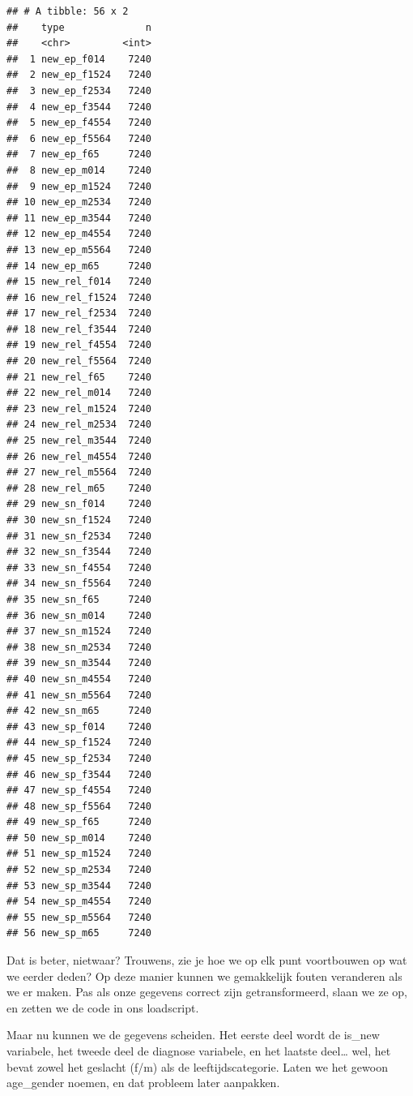 \documentclass[]{tufte-book}
\begin{document}
\begin{verbatim}
## # A tibble: 56 x 2
##    type              n
##    <chr>         <int>
##  1 new_ep_f014    7240
##  2 new_ep_f1524   7240
##  3 new_ep_f2534   7240
##  4 new_ep_f3544   7240
##  5 new_ep_f4554   7240
##  6 new_ep_f5564   7240
##  7 new_ep_f65     7240
##  8 new_ep_m014    7240
##  9 new_ep_m1524   7240
## 10 new_ep_m2534   7240
## 11 new_ep_m3544   7240
## 12 new_ep_m4554   7240
## 13 new_ep_m5564   7240
## 14 new_ep_m65     7240
## 15 new_rel_f014   7240
## 16 new_rel_f1524  7240
## 17 new_rel_f2534  7240
## 18 new_rel_f3544  7240
## 19 new_rel_f4554  7240
## 20 new_rel_f5564  7240
## 21 new_rel_f65    7240
## 22 new_rel_m014   7240
## 23 new_rel_m1524  7240
## 24 new_rel_m2534  7240
## 25 new_rel_m3544  7240
## 26 new_rel_m4554  7240
## 27 new_rel_m5564  7240
## 28 new_rel_m65    7240
## 29 new_sn_f014    7240
## 30 new_sn_f1524   7240
## 31 new_sn_f2534   7240
## 32 new_sn_f3544   7240
## 33 new_sn_f4554   7240
## 34 new_sn_f5564   7240
## 35 new_sn_f65     7240
## 36 new_sn_m014    7240
## 37 new_sn_m1524   7240
## 38 new_sn_m2534   7240
## 39 new_sn_m3544   7240
## 40 new_sn_m4554   7240
## 41 new_sn_m5564   7240
## 42 new_sn_m65     7240
## 43 new_sp_f014    7240
## 44 new_sp_f1524   7240
## 45 new_sp_f2534   7240
## 46 new_sp_f3544   7240
## 47 new_sp_f4554   7240
## 48 new_sp_f5564   7240
## 49 new_sp_f65     7240
## 50 new_sp_m014    7240
## 51 new_sp_m1524   7240
## 52 new_sp_m2534   7240
## 53 new_sp_m3544   7240
## 54 new_sp_m4554   7240
## 55 new_sp_m5564   7240
## 56 new_sp_m65     7240
\end{verbatim}

Dat is beter, nietwaar? Trouwens, zie je hoe we op elk punt voortbouwen op wat we eerder deden? Op deze manier kunnen we gemakkelijk fouten veranderen als we er maken. Pas als onze gegevens correct zijn getransformeerd, slaan we ze op, en zetten we de code in ons loadscript.

Maar nu kunnen we de gegevens scheiden. Het eerste deel wordt de is\_new variabele, het tweede deel de diagnose variabele, en het laatste deel\ldots{} wel, het bevat zowel het geslacht (f/m) als de leeftijdscategorie. Laten we het gewoon age\_gender noemen, en dat probleem later aanpakken.
\end{document}
